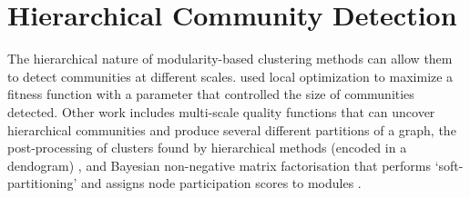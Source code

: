 \documentclass{report}
\begin{document}
	\section{Hierarchical Community Detection}
	
	The hierarchical nature of modularity-based clustering methods can allow them to detect communities at different scales. 
	\cite{lancichinetti2009detecting} used local optimization to maximize a fitness function with a parameter that controlled the size of communities detected.
	Other work includes multi-scale quality functions that can uncover hierarchical communities and produce several different partitions of a graph, the post-processing of clusters found by hierarchical methods (encoded in a dendogram) \cite{pons2011post}, and Bayesian non-negative matrix factorisation that performs `soft-partitioning' and assigns node participation scores to modules \cite{psorakis2011overlapping}.
	
	
	
\end{document}
